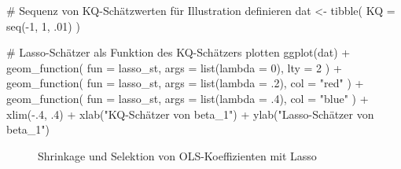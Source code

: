 \documentclass[
  a4paper,
  DIV=11,
  oneside]{scrreprt}
\newenvironment{Shaded}{\begin{snugshade}}{\end{snugshade}}
\newcommand{\AttributeTok}[1]{\textcolor[rgb]{0.40,0.45,0.13}{#1}}
\newcommand{\CommentTok}[1]{\textcolor[rgb]{0.37,0.37,0.37}{#1}}
\newcommand{\DecValTok}[1]{\textcolor[rgb]{0.68,0.00,0.00}{#1}}
\newcommand{\FunctionTok}[1]{\textcolor[rgb]{0.28,0.35,0.67}{#1}}
\newcommand{\NormalTok}[1]{\textcolor[rgb]{0.00,0.23,0.31}{#1}}
\newcommand{\OtherTok}[1]{\textcolor[rgb]{0.00,0.23,0.31}{#1}}
\newcommand{\SpecialCharTok}[1]{\textcolor[rgb]{0.37,0.37,0.37}{#1}}
\newcommand{\StringTok}[1]{\textcolor[rgb]{0.13,0.47,0.30}{#1}}
\begin{document}
\begin{Shaded}
\begin{Highlighting}[]
\CommentTok{\# Sequenz von KQ{-}Schätzwerten für Illustration definieren}
\NormalTok{dat }\OtherTok{\textless{}{-}} \FunctionTok{tibble}\NormalTok{(}
  \AttributeTok{KQ =} \FunctionTok{seq}\NormalTok{(}\SpecialCharTok{{-}}\DecValTok{1}\NormalTok{, }\DecValTok{1}\NormalTok{, .}\DecValTok{01}\NormalTok{)}
\NormalTok{)}

\CommentTok{\# Lasso{-}Schätzer als Funktion des KQ{-}Schätzers plotten}
\FunctionTok{ggplot}\NormalTok{(dat) }\SpecialCharTok{+}
  \FunctionTok{geom\_function}\NormalTok{(}
    \AttributeTok{fun =}\NormalTok{ lasso\_st, }
    \AttributeTok{args =} \FunctionTok{list}\NormalTok{(}\AttributeTok{lambda =} \DecValTok{0}\NormalTok{), }
    \AttributeTok{lty =} \DecValTok{2}
\NormalTok{  ) }\SpecialCharTok{+} 
  \FunctionTok{geom\_function}\NormalTok{(}
    \AttributeTok{fun =}\NormalTok{ lasso\_st, }
    \AttributeTok{args =} \FunctionTok{list}\NormalTok{(}\AttributeTok{lambda =}\NormalTok{ .}\DecValTok{2}\NormalTok{),}
    \AttributeTok{col =} \StringTok{"red"}
\NormalTok{  ) }\SpecialCharTok{+} 
  \FunctionTok{geom\_function}\NormalTok{(}
    \AttributeTok{fun =}\NormalTok{ lasso\_st, }
    \AttributeTok{args =} \FunctionTok{list}\NormalTok{(}\AttributeTok{lambda =}\NormalTok{ .}\DecValTok{4}\NormalTok{), }
    \AttributeTok{col =} \StringTok{"blue"}
\NormalTok{  ) }\SpecialCharTok{+} 
  \FunctionTok{xlim}\NormalTok{(}\SpecialCharTok{{-}}\NormalTok{.}\DecValTok{4}\NormalTok{, .}\DecValTok{4}\NormalTok{) }\SpecialCharTok{+}
  \FunctionTok{xlab}\NormalTok{(}\StringTok{"KQ{-}Schätzer von beta\_1"}\NormalTok{) }\SpecialCharTok{+}
  \FunctionTok{ylab}\NormalTok{(}\StringTok{"Lasso{-}Schätzer von beta\_1"}\NormalTok{)}
\end{Highlighting}
\end{Shaded}

\begin{figure}[t]


\caption{\label{fig-lassoST}Shrinkage und Selektion von
OLS-Koeffizienten mit Lasso}

\end{figure}%
\end{document}
